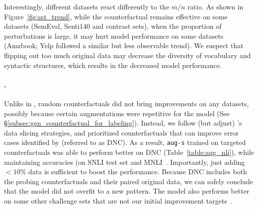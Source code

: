 Interestingly, different datasets react differently to the $m/n$ ratio.
As shown in Figure~\ref{fig:sst_trend}, while the counterfactual remains effective on some datasets (\eg SemEval, Senti140 and contrast sets), when the proportion of perturbations is large, it may hurt model performance on some datasets (Amzbook; Yelp followed a similar but less observable trend).
We suspect that flipping out too much original data may decrease the diversity of vocabulary and syntactic structures, which results in the decreased model performance.


\paragraph{\nli.}
Unlike in \sst, random counterfactuals did not bring improvements on any datasets, possibly because certain augmentations were repetitive for the model (See \S\ref{subsec:gen_counterfactual_for_labeling}).
Instead, we follow (but adjust) \citet{chen2019slice}'s data slicing strategies, and prioritized counterfactuals that can improve error cases identified by \citet{kim2019probing} (referred to as DNC).
As a result, \texttt{aug-s} trained on targeted counterfactuals was able to perform better on DNC (Table~\ref{table:aug_nli}), while maintaining accuracies (on SNLI test set and MNLI~\cite{williams-etal-2018-broad}.
Importantly, just adding $<10\%$ data is sufficient to boost the performance.
Because DNC includes both the probing counterfactuals and their paired original data, we can safely conclude that the model did not overfit to a new pattern.
The model also performs better on some other challenge sets that are not our initial improvement targets~\cite{naik2018stress, glockner-etal-2018-breaking, wang2018glue}.

\TableAugQQP


